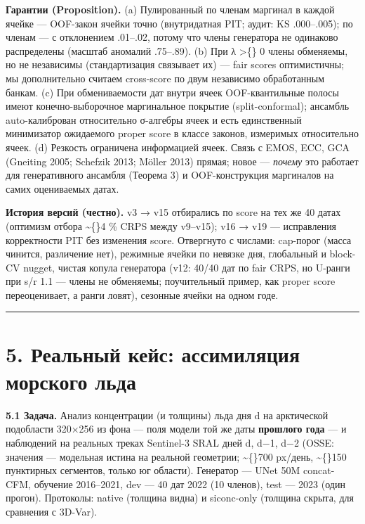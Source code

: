 \documentclass[11pt]{article}
\begin{document}
\textbf{Гарантии (Proposition).} (a) Пулированный по членам маргинал в каждой ячейке — OOF-закон ячейки точно (внутридатная PIT; аудит: KS .000–.005); по членам — с отклонением .01–.02, потому что члены генератора не одинаково распределены (масштаб аномалий .75–.89). (b) При {\symfont λ} \textgreater\{\} 0 члены обменяемы, но не независимы (стандартизация связывает их) — fair scores оптимистичны; мы дополнительно считаем cross-score по двум независимо обработанным банкам. (c) При обмениваемости дат внутри ячеек OOF-квантильные полосы имеют конечно-выборочное маргинальное покрытие (split-conformal); ансамбль auto-калиброван относительно {\symfont σ}-алгебры ячеек и есть единственный минимизатор ожидаемого proper score в классе законов, измеримых относительно ячеек. (d) Резкость ограничена информацией ячеек. Связь с EMOS, ECC, GCA (Gneiting 2005; Schefzik 2013; Möller 2013) прямая; новое — \emph{почему} это работает для генеративного ансамбля (Теорема 3) и OOF-конструкция маргиналов на самих оцениваемых датах.

\textbf{История версий (честно).} v3 {\symfont →} v15 отбирались по score на тех же 40 датах (оптимизм отбора \textasciitilde\{\}4 \% CRPS между v9–v15); v16 {\symfont →} v19 — исправления корректности PIT без изменения score. Отвергнуто с числами: cap-порог (масса чинится, различение нет), режимные ячейки по невязке дня, глобальный и block-CV nugget, чистая копула генератора (v12: 40/40 дат по fair CRPS, но U-ранги при s/r 1.1 — члены не обменяемы; поучительный пример, как proper score переоценивает, а ранги ловят), сезонные ячейки на одном годе.

\bigskip\hrule\bigskip

\section*{5. Реальный кейс: ассимиляция морского льда}

\textbf{5.1 Задача.} Анализ концентрации (и толщины) льда дня d на арктической подобласти 320×256 из фона — поля модели той же даты \textbf{прошлого года} — и наблюдений на реальных треках Sentinel-3 SRAL дней d, d{\symfont −}1, d{\symfont −}2 (OSSE: значения — модельная истина на реальной геометрии; \textasciitilde\{\}700 px/день, \textasciitilde\{\}150 пунктирных сегментов, только юг области). Генератор — UNet 50M concat-CFM, обучение 2016–2021, dev — 40 дат 2022 (10 членов), test — 2023 (один прогон). Протоколы: native (толщина видна) и siconc-only (толщина скрыта, для сравнения с 3D-Var).
\end{document}
